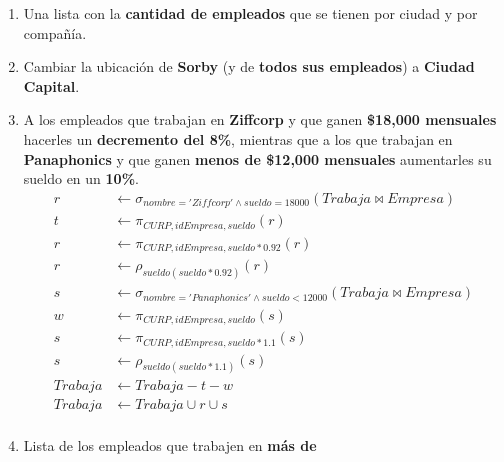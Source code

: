 \documentclass{article}
\begin{document}
\begin{enumerate}
{{\begin{enumerate}
{\begin{align*}
                        \end{align*}
                    }
                    \item {
                        Una lista con la \textbf{cantidad de empleados} que se
                        tienen por ciudad y por compañía.
                    }
                    \item {
                        Cambiar la ubicación de \textbf{Sorby} (y de 
                        \textbf{todos sus empleados}) a \textbf{Ciudad Capital}.
                    }
                    \item {
                        A los empleados que trabajan en \textbf{Ziffcorp} y que
                        ganen \textbf{\$18,000 mensuales} hacerles un
                        \textbf{decremento del 8\%}, mientras que a los que
                        trabajan en \textbf{Panaphonics} y que ganen 
                        \textbf{menos de \$12,000 mensuales} aumentarles su
                        sueldo en un \textbf{10\%}.
                         \begin{align*}
                         r & \leftarrow \sigma_{nombre = 'Ziffcorp' \wedge sueldo = 18 000 }(Trabaja \bowtie Empresa)\\
                         t & \leftarrow \pi_{CURP,idEmpresa,sueldo}(r)\\
                         r & \leftarrow \pi_{CURP,idEmpresa,sueldo*0.92}(r)\\
                         r & \leftarrow \rho_{sueldo(sueldo*0.92)}(r)\\
                         s & \leftarrow \sigma_{nombre = 'Panaphonics' \wedge sueldo < 12 000 }(Trabaja \bowtie Empresa)\\
                         w & \leftarrow \pi_{CURP,idEmpresa,sueldo}(s)\\
                         s & \leftarrow \pi_{CURP,idEmpresa,sueldo*1.1}(s)\\
                         s & \leftarrow \rho_{sueldo(sueldo*1.1)}(s)\\
                         Trabaja & \leftarrow Trabaja - t -w \\
                         Trabaja & \leftarrow Trabaja \cup r \cup s \\
                         \end{align*}
                    }
                    \item {
                        Lista de los empleados que trabajen en \textbf{más de
}}
\end{enumerate}}}
\end{enumerate}
\end{document}
